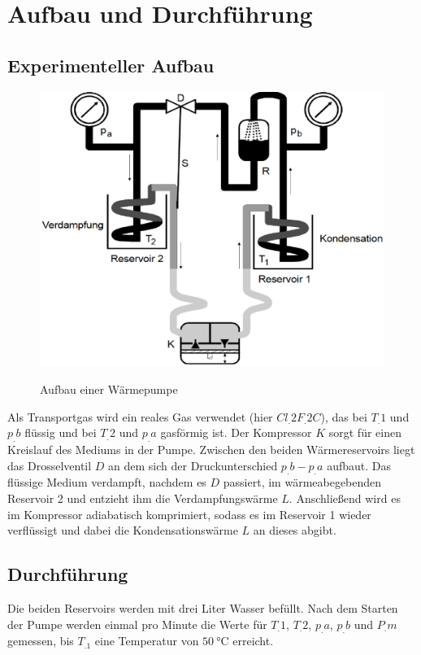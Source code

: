 
\section{Aufbau und Durchführung}
\label{sec:Durchführung}
\subsection{Experimenteller Aufbau}
\begin{figure}
\caption{Aufbau einer Wärmepumpe\cite{V206}}
\includegraphics[scale=0.5]{content/images/aufbau.eps}
\label{fig:abb1}
\end{figure}
\noindent Als Transportgas wird ein reales Gas verwendet (hier $Cl_.{2}F_.{2}C$), das bei $T_.{1}$ und $p_.{b}$ flüssig und bei $T_.{2}$ und $p_.{a}$ gasförmig ist.
Der Kompressor $K$ sorgt für einen Kreislauf des Mediums in der Pumpe.\newline
Zwischen den beiden Wärmereservoirs liegt das Drosselventil $D$
an dem sich der Druckunterschied $p_.{b}-p_.{a}$ aufbaut.\newline
Das flüssige Medium verdampft, nachdem es $D$ passiert, im wärmeabegebenden Reservoir 2 und entzieht ihm die Verdampfungswärme $L$.
Anschließend wird es im Kompressor adiabatisch komprimiert, sodass es im Reservoir 1 wieder verflüssigt und dabei die Kondensationswärme $L$ an dieses abgibt.
\subsection{Durchführung}
Die beiden Reservoirs werden mit drei Liter Wasser befüllt.\newline
Nach dem Starten der Pumpe werden einmal pro Minute die Werte für $T_.{1}$, $T_.{2}$, $p_.{a}$, $p_.{b}$ und $P_.{m}$ gemessen, bis $T_.1$ eine Temperatur von $\SI{50}{\celsius}$ erreicht.